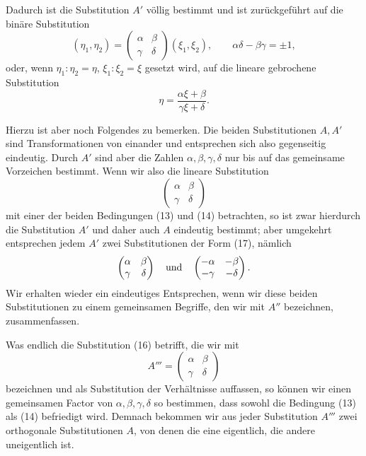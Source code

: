 \documentclass[11pt]{article}
\begin{document}
Dadurch ist die Substitution $A'$ völlig bestimmt und ist zurückgeführt auf die binäre Substitution
\begin{equation}
(\eta_1,\eta_2)=\begin{pmatrix}\alpha&\beta\\\gamma&\delta\end{pmatrix}(\xi_1,\xi_2),
\qquad \alpha\delta-\beta\gamma=\pm1,
\tag{15}
\end{equation}
oder, wenn $\eta_1:\eta_2=\eta$, $\xi_1:\xi_2=\xi$ gesetzt wird, auf die lineare gebrochene Substitution
\begin{equation}
\eta=\frac{\alpha\xi+\beta}{\gamma\xi+\delta}.
\tag{16}
\end{equation}

Hierzu ist aber noch Folgendes zu bemerken. Die beiden Substitutionen $A,A'$ sind Transformationen von einander und entsprechen sich also gegenseitig eindeutig. Durch $A'$ sind aber die Zahlen $\alpha,\beta,\gamma,\delta$ nur bis auf das gemeinsame Vorzeichen bestimmt. Wenn wir also die lineare Substitution
\begin{equation}
\begin{pmatrix}\alpha&\beta\\\gamma&\delta\end{pmatrix}
\tag{17}
\end{equation}
mit einer der beiden Bedingungen (13) und (14) betrachten, so ist zwar hierdurch die Substitution $A'$ und daher auch $A$ eindeutig bestimmt; aber umgekehrt entsprechen jedem $A'$ zwei Substitutionen der Form (17), nämlich
\[
\begin{pmatrix}\alpha&\beta\\\gamma&\delta\end{pmatrix}
\quad\hbox{und}\quad
\begin{pmatrix}-\alpha&-\beta\\-\gamma&-\delta\end{pmatrix}.
\]
Wir erhalten wieder ein eindeutiges Entsprechen, wenn wir diese beiden Substitutionen zu einem gemeinsamen Begriffe, den wir mit $A''$ bezeichnen, zusammenfassen.

Was endlich die Substitution (16) betrifft, die wir mit
\begin{equation}
A'''=\begin{pmatrix}\alpha&\beta\\\gamma&\delta\end{pmatrix}
\tag{18}
\end{equation}
bezeichnen und als Substitution der Verhältnisse auffassen, so können wir einen gemeinsamen Factor von $\alpha,\beta,\gamma,\delta$ so bestimmen, dass sowohl die Bedingung (13) als (14) befriedigt wird. Demnach bekommen wir aus jeder Substitution $A'''$ zwei orthogonale Substitutionen $A$, von denen die eine eigentlich, die andere uneigentlich ist.
\end{document}
